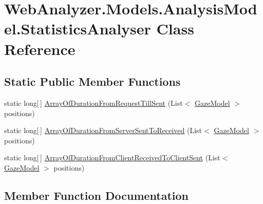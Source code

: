 \hypertarget{class_web_analyzer_1_1_models_1_1_analysis_model_1_1_statistics_analyser}{}\section{Web\+Analyzer.\+Models.\+Analysis\+Model.\+Statistics\+Analyser Class Reference}
\label{class_web_analyzer_1_1_models_1_1_analysis_model_1_1_statistics_analyser}
\subsection*{Static Public Member Functions}
\begin{DoxyCompactItemize}
\item 
static long\mbox{[}$\,$\mbox{]} \hyperlink{class_web_analyzer_1_1_models_1_1_analysis_model_1_1_statistics_analyser_a0a19416111599cf25b18e2cd862600a9}{Array\+Of\+Duration\+From\+Request\+Till\+Sent} (List$<$ \hyperlink{class_web_analyzer_1_1_models_1_1_data_model_1_1_gaze_model}{Gaze\+Model} $>$ positions)
\item 
static long\mbox{[}$\,$\mbox{]} \hyperlink{class_web_analyzer_1_1_models_1_1_analysis_model_1_1_statistics_analyser_ae555b28e5931d366687c66153cb9cb11}{Array\+Of\+Duration\+From\+Server\+Sent\+To\+Received} (List$<$ \hyperlink{class_web_analyzer_1_1_models_1_1_data_model_1_1_gaze_model}{Gaze\+Model} $>$ positions)
\item 
static long\mbox{[}$\,$\mbox{]} \hyperlink{class_web_analyzer_1_1_models_1_1_analysis_model_1_1_statistics_analyser_aa360f68023a2d70d0efb9de8e0c9f749}{Array\+Of\+Duration\+From\+Client\+Received\+To\+Client\+Sent} (List$<$ \hyperlink{class_web_analyzer_1_1_models_1_1_data_model_1_1_gaze_model}{Gaze\+Model} $>$ positions)
\end{DoxyCompactItemize}


\subsection{Member Function Documentation}
\hypertarget{class_web_analyzer_1_1_models_1_1_analysis_model_1_1_statistics_analyser_aa360f68023a2d70d0efb9de8e0c9f749}{}
